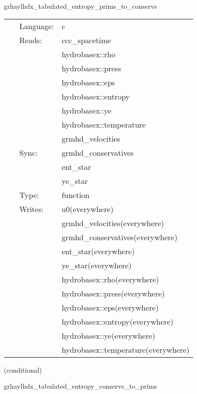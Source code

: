 \documentclass{article}
\begin{document}
\hspace{5mm} grhaylhdx\_tabulated\_entropy\_prims\_to\_conservs 

\hspace{5mm}{\it entropy+tabulated version of grhaylhdx\_prims\_to\_conservs } 


\hspace{5mm}

 \begin{tabular*}{160mm}{cll} 
~ & Language:  & c \\ 
~ & Reads:  & ccc\_spacetime \\ 
~& ~ &hydrobasex::rho\\ 
~& ~ &hydrobasex::press\\ 
~& ~ &hydrobasex::eps\\ 
~& ~ &hydrobasex::entropy\\ 
~& ~ &hydrobasex::ye\\ 
~& ~ &hydrobasex::temperature\\ 
~& ~ &grmhd\_velocities\\ 
~ & Sync:  & grmhd\_conservatives \\ 
~& ~ &ent\_star\\ 
~& ~ &ye\_star\\ 
~ & Type:  & function \\ 
~ & Writes:  & u0(everywhere) \\ 
~& ~ &grmhd\_velocities(everywhere)\\ 
~& ~ &grmhd\_conservatives(everywhere)\\ 
~& ~ &ent\_star(everywhere)\\ 
~& ~ &ye\_star(everywhere)\\ 
~& ~ &hydrobasex::rho(everywhere)\\ 
~& ~ &hydrobasex::press(everywhere)\\ 
~& ~ &hydrobasex::eps(everywhere)\\ 
~& ~ &hydrobasex::entropy(everywhere)\\ 
~& ~ &hydrobasex::ye(everywhere)\\ 
~& ~ &hydrobasex::temperature(everywhere)\\ 
\end{tabular*} 


\vspace{5mm}

   (conditional) 

\hspace{5mm} grhaylhdx\_tabulated\_entropy\_conservs\_to\_prims 
\end{document}
